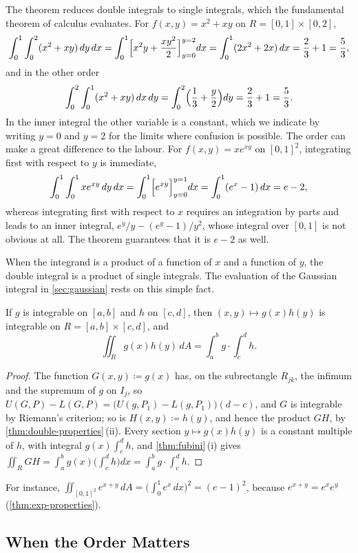 The theorem reduces double integrals to single integrals, which the fundamental theorem of calculus evaluates. For $f(x,y)=x^2+xy$ on $R=[0,1]\times[0,2]$,
\[
\int_0^1\int_0^2(x^2+xy)\,dy\,dx=\int_0^1\Bigl[x^2y+\frac{xy^2}2\Bigr]_{y=0}^{y=2}dx=\int_0^1(2x^2+2x)\,dx=\frac23+1=\frac53 ,
\]
and in the other order
\[
\int_0^2\int_0^1(x^2+xy)\,dx\,dy=\int_0^2\Bigl(\frac13+\frac y2\Bigr)dy=\frac23+1=\frac53 .
\]
In the inner integral the other variable is a constant, which we indicate by writing $y=0$ and $y=2$ for the limits where confusion is possible. The order can make a great difference to the labour. For $f(x,y)=xe^{xy}$ on $[0,1]^2$, integrating first with respect to $y$ is immediate,
\[
\int_0^1\int_0^1xe^{xy}\,dy\,dx=\int_0^1\Bigl[e^{xy}\Bigr]_{y=0}^{y=1}dx=\int_0^1(e^x-1)\,dx=e-2 ,
\]
whereas integrating first with respect to $x$ requires an integration by parts and leads to an inner integral, $e^y/y-(e^y-1)/y^2$, whose integral over $[0,1]$ is not obvious at all. The theorem guarantees that it is $e-2$ as well.

When the integrand is a product of a function of $x$ and a function of $y$, the double integral is a product of single integrals. The evaluation of the Gaussian integral in \cref{sec:gaussian} rests on this simple fact.

\begin{corollary}[Products]
\label{cor:product-integral}
If $g$ is integrable on $[a,b]$ and $h$ on $[c,d]$, then $(x,y)\mapsto g(x)h(y)$ is integrable on $R=[a,b]\times[c,d]$, and
\[
\iint_Rg(x)h(y)\,dA=\int_a^bg\cdot\int_c^dh .
\]
\end{corollary}

\begin{proof}
The function $G(x,y)\coloneqq g(x)$ has, on the subrectangle $R_{jk}$, the infimum and the supremum of $g$ on $I_j$, so $U(G,P)-L(G,P)=\bigl(U(g,P_1)-L(g,P_1)\bigr)(d-c)$, and $G$ is integrable by Riemann's criterion; so is $H(x,y)\coloneqq h(y)$, and hence the product $GH$, by \cref{thm:double-properties}\,(ii). Every section $y\mapsto g(x)h(y)$ is a constant multiple of $h$, with integral $g(x)\int_c^dh$, and \cref{thm:fubini}\,(i) gives $\iint_RGH=\int_a^bg(x)\bigl(\int_c^dh\bigr)dx=\int_a^bg\cdot\int_c^dh$.
\end{proof}

For instance, $\iint_{[0,1]^2}e^{x+y}\,dA=\bigl(\int_0^1e^x\,dx\bigr)^2=(e-1)^2$, because $e^{x+y}=e^xe^y$ (\cref{thm:exp-properties}).

\subsection{When the Order Matters}

